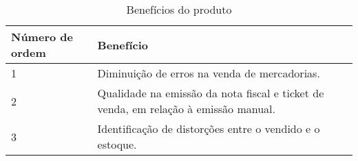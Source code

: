 \documentclass[12pt]{article}
\begin{document}
			\begin{table}[!h]
				\caption{Benefícios do produto}
				\begin{tabularx}{\linewidth}{ | p{1.8cm} | X | }
					\hline
					Número de ordem & Benefício\\
					\hline
					1 & Diminuição de erros na  venda de mercadorias.\\
					\hline
					2 & Qualidade na emissão da nota fiscal e ticket de venda, em relação à emissão manual.\\
					\hline
					3 & Identificação de distorções entre o vendido e o estoque.\\
					\hline
				\end{tabularx}
			\end{table}

			
\end{document}
